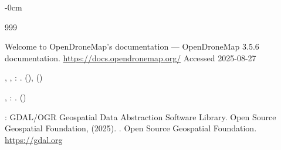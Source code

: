 \documentclass[drones,technicalnote,accept,pdftex,moreauthors]{Definitions/mdpi}
\begin{document}
\begin{adjustwidth}{-\extralength}{0cm}
\begin{thebibliography}{999}
\begin{botherref}
Welcome to {OpenDroneMap}’s documentation — {OpenDroneMap} 3.5.6 documentation.
\url{https://docs.opendronemap.org/}
Accessed 2025-08-27
\end{botherref}
\endbibitem

\begin{barticle}
,
,
:
.
(),
()
\end{barticle}
\endbibitem

\begin{bbook}
,
:
.
()
\end{bbook}
\endbibitem

\begin{botherref}
:
{GDAL/OGR} Geospatial Data Abstraction Software Library.
Open Source Geospatial Foundation,
(2025).
 .
Open Source Geospatial Foundation.
\url{https://gdal.org}
\end{botherref}
\endbibitem


\end{thebibliography}
\end{adjustwidth}
\end{document}
